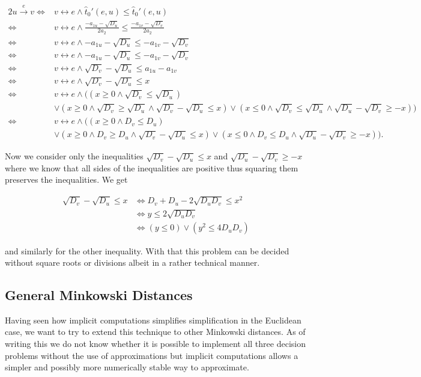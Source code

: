 \begin{alignat*}{2}
  u \overset e\rightarrow v \iff& v \leftrightarrow e \land \hat t_0'(e, u) \leq \hat t_0'(e, u) \\
  \iff& v \leftrightarrow e \land \frac{-a_{1u} - \sqrt{D_u}}{2a_2} \leq \frac{-a_{1v} - \sqrt{D_v}}{2a_2} \\
  \iff& v \leftrightarrow e \land -a_{1u} - \sqrt{D_u} \leq -a_{1v} - \sqrt{D_v} \\
  \iff& v \leftrightarrow e \land -a_{1u} - \sqrt{D_u} \leq -a_{1v} - \sqrt{D_v} \\
  \iff& v \leftrightarrow e \land \sqrt{D_v} - \sqrt{D_u} \leq a_{1u} - a_{1v}  \\
  \iff& v \leftrightarrow e \land \sqrt{D_v} - \sqrt{D_u} \leq x  \\
  \iff& v \leftrightarrow e \land ((x \geq 0 \land \sqrt{D_v} \leq \sqrt{D_u})\\ & \lor (x \geq 0 \land \sqrt{D_v} \geq \sqrt{D_u} \land \sqrt{D_v} - \sqrt{D_u} \leq x )\lor(x \leq 0 \land \sqrt{D_v} \leq \sqrt{D_u} \land \sqrt{D_u} - \sqrt{D_v} \geq -x ) )  \\
  \iff& v \leftrightarrow e \land ((x \geq 0 \land D_v \leq D_u)\\ & \lor (x \geq 0 \land D_v \geq D_u \land \sqrt{D_v} - \sqrt{D_u} \leq x )\lor(x \leq 0 \land D_v \leq D_u \land \sqrt{D_u} - \sqrt{D_v} \geq -x ) ).
\end{alignat*}

Now we consider only the inequalities \(\sqrt{D_v} - \sqrt{D_u} \leq x\) and \(\sqrt{D_u} - \sqrt{D_v} \geq -x\) where we know that all sides of the inequalities are positive thus squaring them preserves the inequalities. We get 

\begin{align*}
  \sqrt{D_v} - \sqrt{D_u} \leq x &\iff D_v + D_u - 2\sqrt{D_uD_v} \leq x^2 \\
   &\iff y \leq 2\sqrt{D_uD_v} \\
   &\iff (y \leq 0) \lor (y^2 \leq 4D_uD_v)
\end{align*}

and similarly for the other inequality. With that this problem can be decided without square roots or divisions albeit in a rather technical manner.

\subsection{General Minkowski Distances}
Having seen how implicit computations simplifies simplification in the Euclidean case, we want to try to extend this technique to other Minkowski distances. As of writing this we do not know whether it is possible to implement all three decision problems without the use of approximations but implicit computations allows a simpler and possibly more numerically stable way to approximate. 


